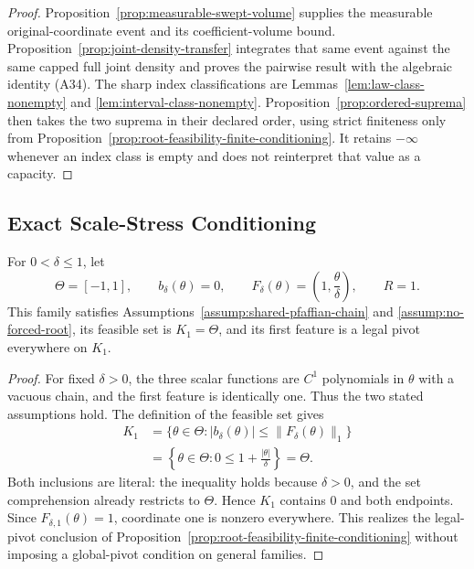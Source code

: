 \begin{proof}
Proposition~\ref{prop:measurable-swept-volume} supplies the measurable
original-coordinate event and its coefficient-volume bound.
Proposition~\ref{prop:joint-density-transfer} integrates that same event
against the same capped full joint density and proves the pairwise result
with the algebraic identity \textup{(A34)}.  The sharp index classifications
are Lemmas~\ref{lem:law-class-nonempty} and
\ref{lem:interval-class-nonempty}.  Proposition~\ref{prop:ordered-suprema}
then takes the two suprema in their declared order, using strict finiteness
only from Proposition~\ref{prop:root-feasibility-finite-conditioning}.
It retains $-\infty$ whenever an index class is empty and does not reinterpret
that value as a capacity.
\end{proof}

\subsection{Exact Scale-Stress Conditioning}

\begin{lemma}
\label{lem:scale-root-feasible}
For $0<\delta\leq1$, let
\[
\Theta=[-1,1],
\qquad b_\delta(\theta)=0,
\qquad F_\delta(\theta)=\left(1,\frac\theta\delta\right),
\qquad R=1.
\]
This family satisfies Assumptions~\ref{assump:shared-pfaffian-chain} and
\ref{assump:no-forced-root}, its feasible set is $K_1=\Theta$, and its
first feature is a legal pivot everywhere on $K_1$.
\end{lemma}

\begin{proof}
For fixed $\delta>0$, the three scalar functions are $C^1$ polynomials in
$\theta$ with a vacuous chain, and the first feature is identically one.
Thus the two stated assumptions hold.  The definition of the feasible set
gives
\[
\begin{aligned}
K_1
&=\{\theta\in\Theta:
 |b_\delta(\theta)|\leq\|F_\delta(\theta)\|_1\}\\
&=\left\{\theta\in\Theta:
 0\leq1+\frac{|\theta|}{\delta}\right\}=\Theta.
\end{aligned}
\tag{A44}
\]
Both inclusions are literal: the inequality holds because $\delta>0$, and
the set comprehension already restricts to $\Theta$.  Hence $K_1$ contains
$0$ and both endpoints.  Since $F_{\delta,1}(\theta)=1$, coordinate one is
nonzero everywhere.  This realizes the legal-pivot conclusion of
Proposition~\ref{prop:root-feasibility-finite-conditioning} without imposing
a global-pivot condition on general families.
\end{proof}

